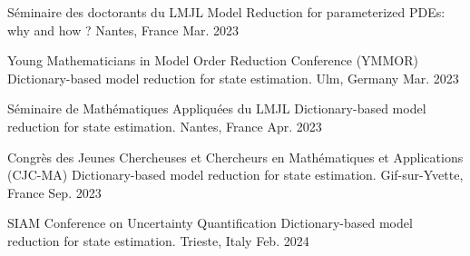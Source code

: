 

\begin{cvpresentations}



\cvpresentation
{S\'eminaire des doctorants du LMJL} %
{Model Reduction for parameterized PDEs: why and how ?} %
{Nantes, France} %
{Mar. 2023} %


\cvpresentation
{Young Mathematicians in Model Order Reduction Conference (YMMOR)} %
{Dictionary-based model reduction for state estimation.} %
{Ulm, Germany} %
{Mar. 2023} %


\cvpresentation
{S\'eminaire de Mathématiques Appliquées du LMJL} %
{Dictionary-based model reduction for state estimation.} %
{Nantes, France} %
{Apr. 2023} %


\cvpresentation
{Congr\`es des Jeunes Chercheuses et Chercheurs en Mathématiques et Applications (CJC-MA)} %
{Dictionary-based model reduction for state estimation.} %
{Gif-sur-Yvette, France} %
{Sep. 2023} %


\cvpresentation
{SIAM Conference on Uncertainty Quantification} %
{Dictionary-based model reduction for state estimation.} %
{Trieste, Italy} %
{Feb. 2024} %



\end{cvpresentations}
